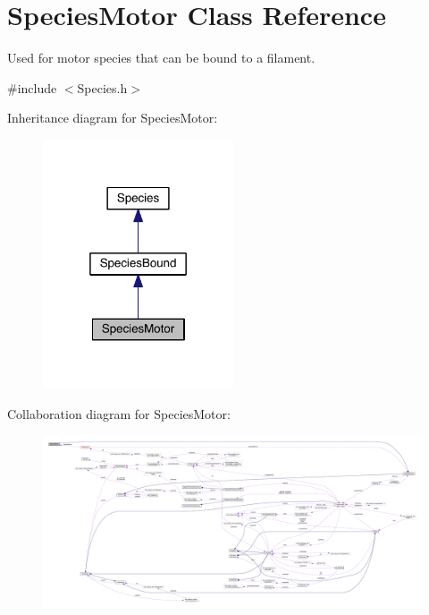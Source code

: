 \hypertarget{classSpeciesMotor}{\section{Species\+Motor Class Reference}
\label{classSpeciesMotor}
}


Used for motor species that can be bound to a filament.  




{\ttfamily \#include $<$Species.\+h$>$}



Inheritance diagram for Species\+Motor\+:\nopagebreak
\begin{figure}[H]
\begin{center}
\leavevmode
\includegraphics[width=160pt]{classSpeciesMotor__inherit__graph}
\end{center}
\end{figure}


Collaboration diagram for Species\+Motor\+:\nopagebreak
\begin{figure}[H]
\begin{center}
\leavevmode
\includegraphics[width=350pt]{classSpeciesMotor__coll__graph}
\end{center}
\end{figure}
